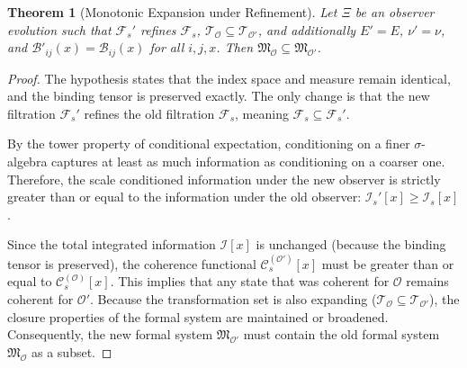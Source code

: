 \documentclass[12pt]{article}
\newtheorem{theorem}{Theorem}
\theoremstyle{definition}
\begin{document}
\begin{theorem}[Monotonic Expansion under Refinement]
Let $\Xi$ be an observer evolution such that $\mathcal{F}_s'$ refines $\mathcal{F}_s$, $\mathcal{T}_{\mathcal{O}} \subseteq \mathcal{T}_{\mathcal{O}'}$, and additionally $E' = E$, $\nu' = \nu$, and $\mathcal{B}'_{ij}(x) = \mathcal{B}_{ij}(x)$ for all $i,j,x$. Then $\mathfrak{M}_{\mathcal{O}} \subseteq \mathfrak{M}_{\mathcal{O}'}$.
\end{theorem}
\begin{proof}
The hypothesis states that the index space and measure remain identical, and the binding tensor is preserved exactly. The only change is that the new filtration $\mathcal{F}_s'$ refines the old filtration $\mathcal{F}_s$, meaning $\mathcal{F}_s \subseteq \mathcal{F}_s'$. 

By the tower property of conditional expectation, conditioning on a finer $\sigma$-algebra captures at least as much information as conditioning on a coarser one. Therefore, the scale conditioned information under the new observer is strictly greater than or equal to the information under the old observer: $\mathcal{I}_s'[x] \geq \mathcal{I}_s[x]$. 

Since the total integrated information $\mathcal{I}[x]$ is unchanged (because the binding tensor is preserved), the coherence functional $\mathcal{C}_s^{(\mathcal{O}')}[x]$ must be greater than or equal to $\mathcal{C}_s^{(\mathcal{O})}[x]$. This implies that any state that was coherent for $\mathcal{O}$ remains coherent for $\mathcal{O}'$. Because the transformation set is also expanding ($\mathcal{T}_{\mathcal{O}} \subseteq \mathcal{T}_{\mathcal{O}'}$), the closure properties of the formal system are maintained or broadened. Consequently, the new formal system $\mathfrak{M}_{\mathcal{O}'}$ must contain the old formal system $\mathfrak{M}_{\mathcal{O}}$ as a subset.
\end{proof}
\end{document}
